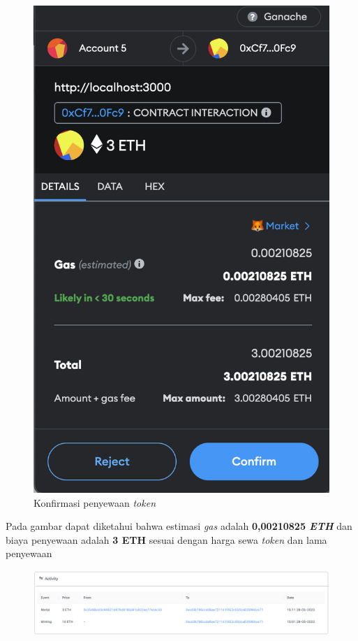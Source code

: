 \begin{itemize}
          \begin{figure} [H] \centering
        \includegraphics[scale=0.4]{gambar/img-test-rent-rent-2.png}
        \caption{Konfirmasi penyewaan \emph{token}}
        \label{fig:TestRentKonfirmasiPenyewaanToken}
      \end{figure}
        Pada gambar dapat diketahui bahwa estimasi \emph{gas} adalah \textbf{0,00210825 \emph{ETH}} dan biaya penyewaan adalah \textbf{3 ETH} sesuai dengan harga sewa \emph{token} dan lama penyewaan
      \begin{figure} [H] \centering
          \includegraphics[scale=0.3]{gambar/img-test-rent-rent-3.png}

\end{figure}
\end{itemize}
